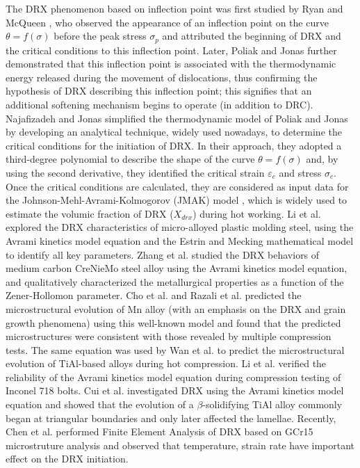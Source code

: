 \documentclass[metals,article,submit,pdftex,moreauthors]{Definitions/mdpi}
\makeatletter
\DeclareRobustCommand{\eal}{et al.\@\xspace}
\makeatother
\begin{document}
The DRX phenomenon based on inflection point was first studied by Ryan and McQueen \cite{ryan1989dynamic,ryan1990dynamic,ryan1990flow}, who observed the appearance of an inflection point on the curve $\theta=f(\sigma)$ before the peak stress $\sigma_p$ and attributed the beginning of DRX and the critical conditions to this inflection point. Later, Poliak and Jonas \cite{Poliak-1996,ei2003initiation,ei2003critical,jonas2003critical} further demonstrated that this inflection point is associated with the thermodynamic energy released during the movement of dislocations, thus confirming the hypothesis of DRX describing this inflection point; this signifies that an additional softening mechanism begins to operate (in addition to DRC). Najafizadeh and Jonas \cite{najafizadeh2006predicting} simplified the thermodynamic model of Poliak and Jonas by developing an analytical technique, widely used nowadays, to determine the critical conditions for the initiation of DRX. In their approach, they adopted a third-degree polynomial to describe the shape of the curve $\theta=f(\sigma)$ and, by using the second derivative, they identified the critical strain $\varepsilon_c$ and stress $\sigma_c$. Once the critical conditions are calculated, they are considered as input data for the Johnson-Mehl-Avrami-Kolmogorov (JMAK) model \cite{Avrami-1939}, which is widely used to estimate the volumic fraction of DRX ($X_{drx}$) during hot working. Li \eal \cite{li2015experimental} explored the DRX characteristics of micro-alloyed plastic molding steel, using the Avrami kinetics model equation and the Estrin and Mecking mathematical model \cite{estrin1984unified,mecking1981kinetics} to identify all key parameters. Zhang \eal \cite{zhang2016kinetics} studied the DRX behaviors of medium carbon CreNieMo steel alloy using the Avrami kinetics model equation, and qualitatively characterized the metallurgical properties as a function of the Zener-Hollomon parameter. Cho \eal \cite{cho2005prediction} and Razali \eal \cite{razali2021new} predicted the microstructural evolution of Mn alloy (with an emphasis on the DRX and grain growth phenomena) using this well-known model and found that the predicted microstructures were consistent with those revealed by multiple compression tests. The same equation was used by Wan \eal \cite{wan2017experimental} to predict the microstructural evolution of TiAl-based alloys during hot compression. Li \eal \cite{li2018finite} verified the reliability of the Avrami kinetics model equation during compression testing of Inconel 718 bolts. Cui \eal \cite{cui2016hot} investigated DRX using the Avrami kinetics model equation and showed that the evolution of a $\beta$-solidifying TiAl alloy commonly began at triangular boundaries and only later affected the lamellae. Recently, Chen \eal \cite{chen2023finite} performed Finite Element Analysis of DRX based on GCr15 microstruture analysis and observed that temperature, strain rate have important effect on the DRX initiation.
\end{document}
